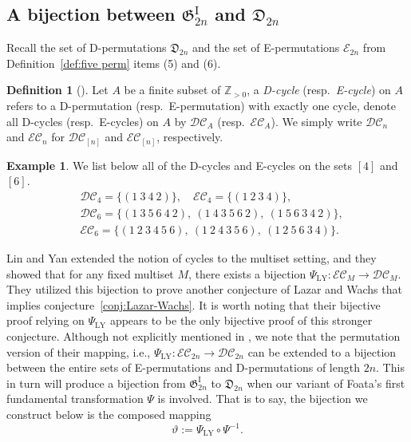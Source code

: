 \documentclass[11pt,reqno]{amsart}
\numberwithin{equation}{section}
\theoremstyle{plain}
\theoremstyle{definition}
\newtheorem{Def}[theorem]{Definition}
\newtheorem{example}[theorem]{Example}
\newcommand{\cE}{\mathcal{E}}
\newcommand{\fD}{\mathfrak{D}}
\newcommand{\fG}{\mathfrak{G}}
\newcommand{\GI}{\fG^{\mathrm{I}}}
\def\DC{\mathcal{DC}}
\def\EC{\mathcal{EC}}
\def\PLY{\Psi_{\mathrm{LY}}}
\begin{document}
\subsection{A bijection between \texorpdfstring{$\GI_{2n}$}{G2n} and \texorpdfstring{$\mathfrak{D}_{2n}$}{D2n} }

Recall the set of D-permutations $\fD_{2n}$ and the set of E-permutations $\cE_{2n}$ from Definition~\ref{def:five perm} items (5) and (6).

\begin{Def}[{\cite[Sec.~4.1]{LW22}}]\label{d cycyle def}
	 Let $A$ be a finite subset of $\mathbb{Z}_{>0}$, a \emph{D-cycle} (resp.~\emph{E-cycle}) on $A$ refers to a D-permutation (resp.~E-permutation) with exactly one cycle, denote all D-cycles (resp.~E-cycles) on $A$ by $\DC_{A}$ (resp.~$\EC_A$). We simply write $\DC_n$ and $\EC_{n}$ for $\DC_{[n]}$ and $\EC_{[n]}$, respectively.
\end{Def}

\begin{example}\label{cycle example}
We list below all of the D-cycles and E-cycles on the sets $[4]$ and $[6]$.
	\begin{align*}
		&\DC_{4}=\{(1~3~4~2)\},\quad \EC_{4}=\{(1~2~3~4)\}, \\
		&\DC_{6}=\{(1~3~5~6~4~2),~(1~4~3~5~6~2),~(1~5~6~3~4~2)\}, \\ 
		&\EC_{6}=\{(1~2~3~4~5~6),~(1~2~4~3~5~6),~(1~2~5~6~3~4)\}.
\end{align*}
\end{example}

Lin and Yan extended the notion of cycles to the multiset setting, and they showed \cite[Theorem~3]{LY22} that for any fixed multiset $M$, there exists a bijection $\PLY: \EC_M\to \DC_M $. They utilized this bijection to prove another conjecture of Lazar and Wachs \cite[Conjecture~6.5]{LW22} that implies conjecture~\ref{conj:Lazar-Wachs}. It is worth noting that their bijective proof relying on $\PLY$ appears to be the only bijective proof of this stronger conjecture. Although not explicitly mentioned in \cite{LY22}, we note that the permutation version of their mapping, i.e., $\PLY:\EC_{2n}\to\DC_{2n}$ can be extended to a bijection between the entire sets of E-permutations and D-permutations of length $2n$. This in turn will produce a bijection from $\GI_{2n}$ to $\fD_{2n}$ when our variant of Foata's first fundamental transformation $\Psi$ is involved. That is to say, the bijection we construct below is the composed mapping
$$\vartheta:=\PLY\circ\Psi^{-1}.$$
\end{document}
